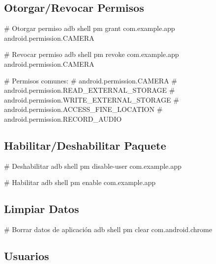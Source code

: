 \documentclass[
  doc,
  floatsintext,
  longtable,
  a4paper,
  nolmodern,
  notxfonts,
  notimes,
  12pt,
  colorlinks=true,linkcolor=blue,citecolor=blue,urlcolor=blue]{apa7}
\newenvironment{Shaded}{\begin{snugshade}}{\end{snugshade}}
\newcommand{\CommentTok}[1]{\textcolor[rgb]{0.37,0.37,0.37}{#1}}
\newcommand{\ExtensionTok}[1]{\textcolor[rgb]{0.00,0.23,0.31}{#1}}
\newcommand{\NormalTok}[1]{\textcolor[rgb]{0.00,0.23,0.31}{#1}}
\begin{document}
\subsection{Otorgar/Revocar Permisos}\label{otorgarrevocar-permisos}

\begin{Shaded}
\begin{Highlighting}[]
\CommentTok{\# Otorgar permiso}
\ExtensionTok{adb}\NormalTok{ shell pm grant com.example.app android.permission.CAMERA}

\CommentTok{\# Revocar permiso}
\ExtensionTok{adb}\NormalTok{ shell pm revoke com.example.app android.permission.CAMERA}

\CommentTok{\# Permisos comunes:}
\CommentTok{\# android.permission.CAMERA}
\CommentTok{\# android.permission.READ\_EXTERNAL\_STORAGE}
\CommentTok{\# android.permission.WRITE\_EXTERNAL\_STORAGE}
\CommentTok{\# android.permission.ACCESS\_FINE\_LOCATION}
\CommentTok{\# android.permission.RECORD\_AUDIO}
\end{Highlighting}
\end{Shaded}

\subsection{Habilitar/Deshabilitar
Paquete}\label{habilitardeshabilitar-paquete}

\begin{Shaded}
\begin{Highlighting}[]
\CommentTok{\# Deshabilitar}
\ExtensionTok{adb}\NormalTok{ shell pm disable{-}user com.example.app}

\CommentTok{\# Habilitar}
\ExtensionTok{adb}\NormalTok{ shell pm enable com.example.app}
\end{Highlighting}
\end{Shaded}

\subsection{Limpiar Datos}\label{limpiar-datos}

\begin{Shaded}
\begin{Highlighting}[]
\CommentTok{\# Borrar datos de aplicación}
\ExtensionTok{adb}\NormalTok{ shell pm clear com.android.chrome}
\end{Highlighting}
\end{Shaded}

\subsection{Usuarios}\label{usuarios}
\end{document}
